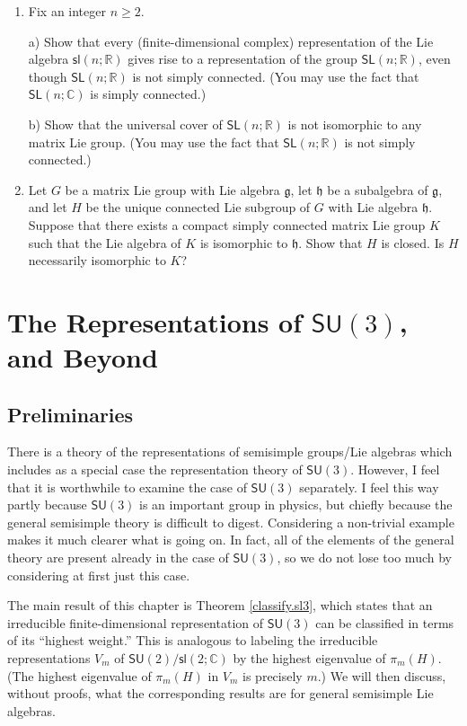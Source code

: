 \documentclass{amsbook}
\let \frak = \mathfrak
\theoremstyle{plain}
\numberwithin{equation}{chapter}
\numberwithin{theorem}{chapter}
\begin{document}
\begin{enumerate}
\item \label{not.matrix}Fix an integer $n\geq2$.

a) Show that every (finite-dimensional complex) representation of the Lie
algebra $\mathsf{sl}\left(  n;\mathbb{R}\right)  $ gives rise to a
representation of the group $\mathsf{SL}\left(  n;\mathbb{R}\right)  $, even
though $\mathsf{SL}\left(  n;\mathbb{R}\right)  $ is not simply connected.
(You may use the fact that $\mathsf{SL}\left(  n;\mathbb{C}\right)  $ is
simply connected.)

b) Show that the universal cover of $\mathsf{SL}\left(  n;\mathbb{R}\right)  $
is not isomorphic to any matrix Lie group. (You may use the fact that
$\mathsf{SL}\left(  n;\mathbb{R}\right)  $ is not simply connected.)

\item  Let $G$ be a matrix Lie group with Lie algebra $\frak{g}$, let
$\frak{h}$ be a subalgebra of $\frak{g}$, and let $H$ be the unique connected
Lie subgroup of $G$ with Lie algebra $\frak{h}$. Suppose that there exists a
compact simply connected matrix Lie group $K$ such that the Lie algebra of $K$
is isomorphic to $\frak{h}$. Show that $H$ is closed. Is $H$ necessarily
isomorphic to $K$?
\end{enumerate}

\chapter{The Representations of $\mathsf{SU}(3)$, and Beyond}

\section{Preliminaries}

There is a theory of the representations of semisimple groups/Lie algebras
which includes as a special case the representation theory of $\mathsf{SU}(3)
$. However, I feel that it is worthwhile to examine the case of $\mathsf{SU}%
(3)$ separately. I feel this way partly because $\mathsf{SU}(3)$ is an
important group in physics, but chiefly because the general semisimple theory
is difficult to digest. Considering a non-trivial example makes it much
clearer what is going on. In fact, all of the elements of the general theory
are present already in the case of $\mathsf{SU}(3)$, so we do not lose too
much by considering at first just this case.

The main result of this chapter is Theorem \ref{classify.sl3}, which states
that an irreducible finite-dimensional representation of $\mathsf{SU}(3)$ can
be classified in terms of its ``highest weight.'' This is analogous to
labeling the irreducible representations $V_{m}$ of $\mathsf{SU}%
(2)/\mathsf{sl}(2;\mathbb{C})$ by the highest eigenvalue of $\pi_{m}(H)$. (The
highest eigenvalue of $\pi_{m}(H)$ in $V_{m}$ is precisely $m$.) We will then
discuss, without proofs, what the corresponding results are for general
semisimple Lie algebras.
\end{document}
